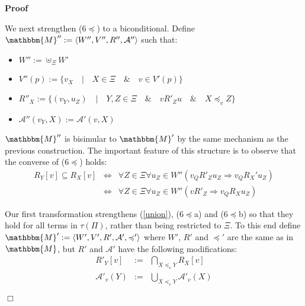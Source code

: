 \documentclass{article}
\newcommand{\assign}{:=}
\newenvironment{itemizedot}{\begin{itemize} \renewcommand{\labelitemi}{$\bullet$}\renewcommand{\labelitemii}{$\bullet$}\renewcommand{\labelitemiii}{$\bullet$}\renewcommand{\labelitemiv}{$\bullet$}}{\end{itemize}}
\newenvironment{proof}{\noindent\textbf{Proof\ }}{\hspace*{\fill}$\Box$\medskip}
\begin{document}
\begin{proof}
  
  
  We next strengthen (6$\preccurlyeq$) to a biconditional.  Define
  $\mathbbm{M}'' \assign \langle W'', V'', R'', \mathcal{A}'' \rangle$ such
  that:
  \begin{itemizedot}
    \item $W'' \assign \uplus_{\Xi} W'$
    
    \item $V'' (p) \assign \{v_X \hspace{1em} | \hspace{1em} X \in \Xi
    \hspace{1em} \& \hspace{1em} v \in V' (p)\}$
    
    \item $R''_X \assign \{(v_Y, u_Z) \hspace{1em} | \hspace{1em} Y, Z \in \Xi
    \hspace{1em} \& \hspace{1em} v R'_Z u \hspace{1em} \& \hspace{1em} X
    \preccurlyeq_v Z\}$
    
    \item $\mathcal{A}'' (v_Y, X) \assign \mathcal{A}' (v, X)$
  \end{itemizedot}
  $\mathbbm{M}''$ is bisimular to $\mathbbm{M}'$ by the same mechanism as the
  previous construction.  The important feature of this structure is to
  observe that the converse of (6$\preccurlyeq$) holds:
  \begin{eqnarray*}
    R_Y [v] \subseteq R_X [v] & \Longleftrightarrow & \forall Z \in \Xi
    \forall u_Z \in W'' (v_Q R'_Z u_Z \Longrightarrow v_Q R_X' u_Z)\\
    & \Longleftrightarrow & \forall Z \in \Xi \forall u_Z \in W'' (v R'_Z
    \Longrightarrow v_Q R_X u_Z)
  \end{eqnarray*}
  
  
  Our first transformation strengthens (\ref{union}), (6$\preccurlyeq$a) and
  (6$\preccurlyeq$b) so that they hold for all terms in $\tau (\Pi)$, rather
  than being restricted to $\Xi$.  To this end define $\mathbbm{M}' \assign
  \langle W', V', R', \mathcal{A}', \preccurlyeq' \rangle$ where $W'$, $R'$
  and $\preccurlyeq'$ are the same as in $\mathbbm{M}$, but $R'$ and
  $\mathcal{A}'$ have the following modifications:
  \begin{eqnarray}
    R'_Y [v] & \assign & \bigcap_{X \preccurlyeq_v Y} R_X [v] \nonumber\\
    \mathcal{A}'_v (Y) & \assign & \bigcup_{X \preccurlyeq_v Y} \mathcal{A}'_v
    (X) \nonumber
  \end{eqnarray}
  
\end{proof}
\end{document}
